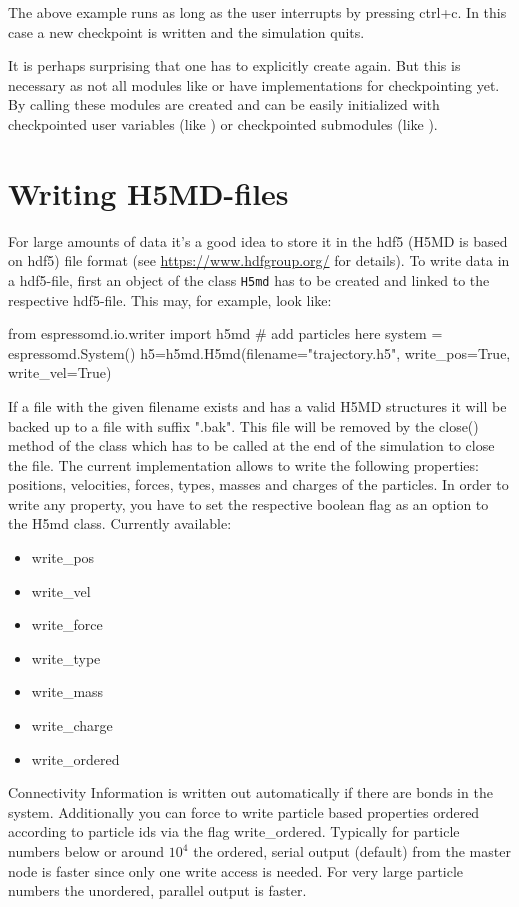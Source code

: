 The above example runs as long as the user interrupts by pressing ctrl+c. 
In this case a new checkpoint is written and the simulation quits.

It is perhaps surprising that one has to explicitly create  again. 
But this is necessary as not all \es modules like  or 
 have implementations for checkpointing yet. By calling 
 these modules are created and can be easily initialized with 
checkpointed user variables (like ) or checkpointed \es submodules 
(like ).


\section{Writing H5MD-files}
For large amounts of data it's a good idea to store it in the hdf5 (H5MD is
based on hdf5) file format
(see \url{https://www.hdfgroup.org/} for details).
To write data in a hdf5-file, first an object of the class \texttt{H5md} has to
be created and linked to the respective hdf5-file. This may, for example, look
like:
\begin{pycode}
from espressomd.io.writer import h5md
# add particles here
system = espressomd.System()
h5=h5md.H5md(filename="trajectory.h5", write_pos=True, write_vel=True)
\end{pycode}
If a file with the given filename exists and has a valid H5MD structures it
will be backed up to a file with suffix ".bak". This file will be removed by
the close() method of the class which has to be called at the end of the
simulation to close the file. The current implementation allows to write the
following properties: positions, velocities, forces, types, masses and charges of the
particles. In order to write any property, you have to set the respective
boolean flag as an option to the H5md class. Currently available:
\begin{itemize}
    \item write_pos
    \item write_vel
    \item write_force
    \item write_type
    \item write_mass
    \item write_charge
    \item write_ordered
\end{itemize}
Connectivity Information is written out automatically if there are bonds in the system.
Additionally you can force \es to write particle based properties ordered according to particle ids via the flag write\_ordered. Typically for particle numbers below or around $10^4$ the ordered, serial output (default) from the master node is faster since only one write access is needed. For very large particle numbers the unordered, parallel output is faster. 
